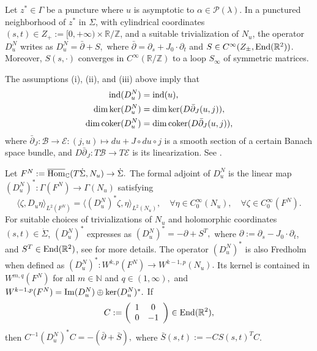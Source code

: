 \documentclass{amsart}
\newcommand{\C}{\mathbb{C}}
\newcommand{\R}{\mathbb{R}}
\newcommand{\Z}{\mathbb{Z}}
\newcommand{\N}{\mathbb{N}}
\renewcommand{\P}{\mathcal{P}}
\newcommand{\ind}{\textnormal{ind}}
\newcommand{\coker}{\textnormal{coker}}
\begin{document}
Let $z^* \in \Gamma$ be a puncture where $u$ is asymptotic to $\alpha\in \P(\lambda)$. In a punctured neighborhood of $z^*$ in $\Sigma$, with cylindrical coordinates $(s,t)\in Z_+ := [0,+\infty)\times \R / \Z$, and a suitable trivialization of $N_u$, the operator $D_u^N$  writes as
$D_u^N = \bar{\partial}+S,$
where $\bar{\partial}=\partial_s+J_0\cdot \partial_t$ and $S \in C^{\infty}(Z_{\pm},{\rm End}(\R^{2}))$. Moreover,  $S(s,\cdot)$ converges in $C^\infty(\R / \Z)$ to a  loop $S_\infty$ of symmetric matrices. 





The assumptions (i), (ii), and (iii) above imply that 
$$
\begin{aligned}
    \ind(D_u^N) & =\ind(u),\\
    \dim \ker (D_u^N) & = \dim \ker (D\bar{\partial}_J(u,j)), \\
    \dim \coker (D_u^N) & = \dim \coker (D\bar{\partial}_J(u,j)),
\end{aligned}
$$
where $\bar \partial_J:\mathcal{B} \to \mathcal{E}:(j,u) \mapsto du + J \circ du \circ j$ is a smooth section of a certain Banach space bundle,  and $D\bar \partial_J: T\mathcal{B} \to T \mathcal{E}$ is its linearization. See  \cite[Theorem 3]{W10}.




Let
$
F^N:=\overline{\rm Hom}_{\C}(T\dot{\Sigma},N_u) \to \dot{\Sigma}.
$ 
The formal adjoint of $D_u^N$ is the linear map
$(D_u^{N})^*: \Gamma(F^N) \to \Gamma(N_u)$
satisfying
$$
\langle \zeta, D_u\eta\rangle_{L^2(F^N)}=\langle (D_u^{N})^*\zeta, \eta\rangle_{L^2(N_u)}, \quad \forall \eta \in C_0^{\infty}(N_u), \quad \forall \zeta \in C_0^{\infty}(F^N).
$$
For suitable choices of trivializations of $N_u$ and holomorphic coordinates $(s,t)\in \dot \Sigma$, $(D_u^N)^*$ expresses as
$(D_u^{N})^*=-\partial+S^T,$
where $\partial:=\partial_s-J_0 \cdot \partial_t$, and $S^T \in {\rm End}(\R^2)$, see \cite{W16} for more details. 
The operator $(D_u^{N})^*$ is also Fredholm when defined as 
$
(D_u^{N})^*: W^{k,p}(F^N) \to W^{k-1 ,p}(N_u).
$
Its kernel is contained in $W^{m,q}(F^N)$ for all $m \in \N$ and $q \in (1, \infty),$ and
$W^{k-1,p}(F^N)={\rm Im} (D_u^N) \oplus \ker (D^{N}_u)^*.$
If $$C:= \left(\begin{array}{cc}
1 & 0\\
0 & -1
\end{array}\right)\in {\rm End}(\R^{2}),$$ then
$C^{-1}(D_u^N)^*C=-(\bar{\partial} + \bar{S}),$
where $\bar{S}(s,t):=-CS(s,t)^TC$. 
\end{document}
